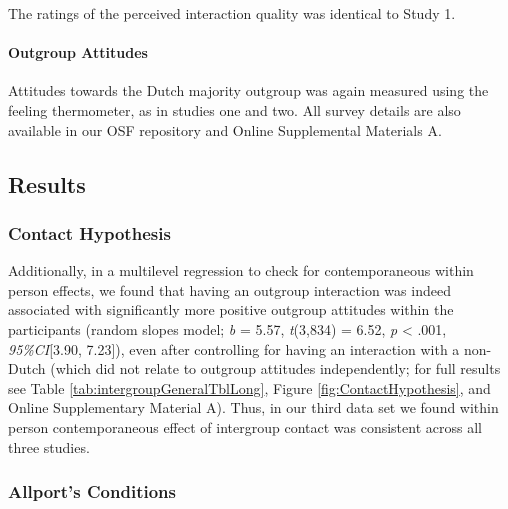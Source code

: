 The ratings of the perceived interaction quality was identical to Study
1.

\paragraph{Outgroup Attitudes}

Attitudes towards the Dutch majority outgroup was again measured using
the feeling thermometer, as in studies one and two. All survey details
are also available in our OSF repository \citep{KreienkampMasked2022a}
and Online Supplemental Materials A.

\subsection{Results}

\subsubsection{Contact Hypothesis}

Additionally, in a multilevel regression to check for contemporaneous
within person effects, we found that having an outgroup interaction was
indeed associated with significantly more positive outgroup attitudes
within the participants (random slopes model; \textit{b} = 5.57,
\textit{t}(3,834) = 6.52, \textit{p} \textless{} .001,
\textit{95\%CI}{[}3.90, 7.23{]}), even after controlling for having an
interaction with a non-Dutch (which did not relate to outgroup attitudes
independently; for full results see Table
\ref{tab:intergroupGeneralTblLong}, Figure \ref{fig:ContactHypothesis},
and Online Supplementary Material A). Thus, in our third data set we
found within person contemporaneous effect of intergroup contact was
consistent across all three studies.

\subsubsection{Allport's Conditions}


